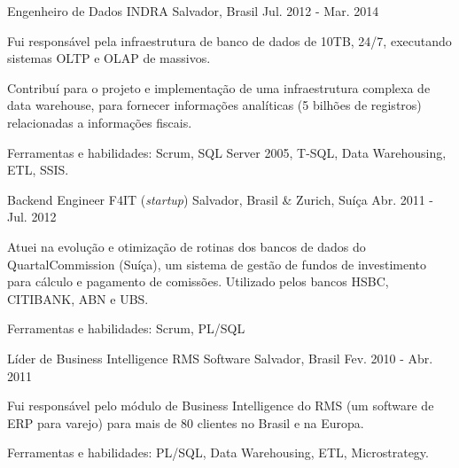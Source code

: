 \begin{cventries}

\cventry
{Engenheiro de Dados} %
{INDRA} %
{Salvador, Brasil} %
{Jul. 2012 - Mar. 2014} %
{ %
\begin{cvitems}
	\item{Fui responsável pela infraestrutura de banco de dados de 10TB, 24/7, executando sistemas OLTP e OLAP de massivos.}
	\item{Contribuí para o projeto e implementação de uma infraestrutura complexa de data warehouse, para fornecer informações analíticas (5 bilhões de registros) relacionadas a informações fiscais.}
	\item{Ferramentas e habilidades: Scrum, SQL Server 2005, T-SQL, Data Warehousing, ETL, SSIS.}
\end{cvitems} 
}


\cventry
{Backend Engineer} %
{F4IT (\textit{startup})} %
{Salvador, Brasil \& Zurich, Suíça} %
{Abr. 2011 - Jul. 2012} %
{ %
\begin{cvitems}
	\item{Atuei na evolução e otimização de rotinas dos bancos de dados do QuartalCommission (Suíça), um sistema de gestão de fundos de investimento para cálculo e pagamento de comissões. Utilizado pelos bancos HSBC, CITIBANK, ABN e UBS.}
	\item{Ferramentas e habilidades: Scrum, PL/SQL}
\end{cvitems}
}


\cventry
{Líder de Business Intelligence} %
{RMS Software} %
{Salvador, Brasil} %
{Fev. 2010 - Abr. 2011} %
{ %
\begin{cvitems}
	\item{Fui responsável pelo módulo de Business Intelligence do RMS (um software de ERP para varejo) para mais de 80 clientes no Brasil e na Europa.}
	\item{Ferramentas e habilidades: PL/SQL, Data Warehousing, ETL, Microstrategy.}
\end{cvitems}
}



\end{cventries}
